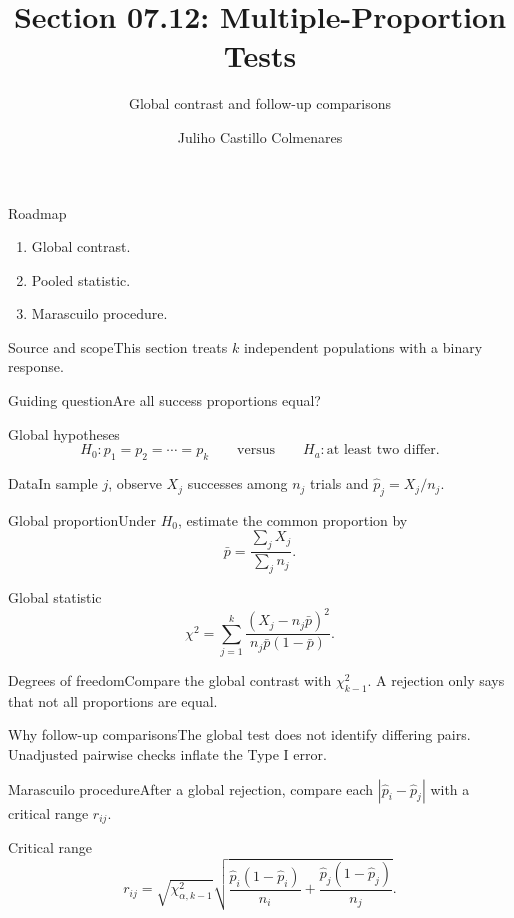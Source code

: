 \documentclass[10pt,aspectratio=169]{beamer}
\title[Multiple proportions]{Section 07.12: Multiple-Proportion Tests}\subtitle{Global contrast and follow-up comparisons}
\author[J. Castillo Colmenares]{Juliho Castillo Colmenares}\institute{Tecnológico de Monterrey}\date{}
\begin{document}
\begin{frame}[plain]\titlepage\end{frame}
\begin{frame}{Roadmap}\small\begin{enumerate}\item Global contrast.\item Pooled statistic.\item Marascuilo procedure.\end{enumerate}\end{frame}
\begin{frame}{Source and scope}\small This section treats $k$ independent populations with a binary response.\begin{block}{Guiding question}Are all success proportions equal?\end{block}\end{frame}
\begin{frame}{Global hypotheses}\small\[H_0:p_1=p_2=\cdots=p_k\qquad\text{versus}\qquad H_a:\text{at least two differ}.\]\end{frame}
\begin{frame}{Data}\small In sample $j$, observe $X_j$ successes among $n_j$ trials and $\hat p_j=X_j/n_j$.\end{frame}
\begin{frame}{Global proportion}\small Under $H_0$, estimate the common proportion by\[\bar p=\frac{\sum_jX_j}{\sum_jn_j}.\]\end{frame}
\begin{frame}{Global statistic}\small\[\chi^2=\sum_{j=1}^{k}\frac{(X_j-n_j\bar p)^2}{n_j\bar p(1-\bar p)}.\]\end{frame}
\begin{frame}{Degrees of freedom}\small Compare the global contrast with $\chi^2_{k-1}$. A rejection only says that not all proportions are equal.\end{frame}
\begin{frame}{Why follow-up comparisons}\small The global test does not identify differing pairs. Unadjusted pairwise checks inflate the Type I error.\end{frame}
\begin{frame}{Marascuilo procedure}\small After a global rejection, compare each $|\hat p_i-\hat p_j|$ with a critical range $r_{ij}$.\end{frame}
\begin{frame}{Critical range}\small\[r_{ij}=\sqrt{\chi^2_{\alpha,k-1}}\sqrt{\frac{\hat p_i(1-\hat p_i)}{n_i}+\frac{\hat p_j(1-\hat p_j)}{n_j}}.\]\end{frame}
\end{document}
